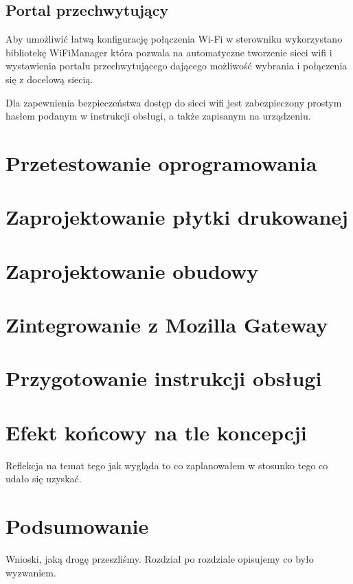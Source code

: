 \documentclass[12pt]{report}
\begin{document}
 
 \section{Portal przechwytujący}
 Aby umożliwić łatwą konfigurację połączenia Wi-Fi w sterowniku wykorzystano bibliotekę WiFiManager która pozwala na automatyczne tworzenie sieci wifi i wystawienia portalu przechwytującego dającego możliwość wybrania i połączenia się z docelową siecią. 
 
 Dla zapewnienia bezpieczeństwa dostęp do sieci wifi jest zabezpieczony prostym hasłem podanym w instrukcji obsługi, a także zapisanym na urządzeniu.
 
 
 
 
 
 \chapter{Przetestowanie oprogramowania}
 
 \chapter{Zaprojektowanie płytki drukowanej}
 
 \chapter{Zaprojektowanie obudowy}
 
 \chapter{Zintegrowanie z Mozilla Gateway}
 
 \chapter{Przygotowanie instrukcji obsługi}
 
 \chapter{Efekt końcowy na tle koncepcji}
 Reflekcja na temat tego jak wygląda to co zaplanowałem w stosunko tego co udało się uzyskać.
 
 \chapter*{Podsumowanie}
 Wnioski, jaką drogę przeszliśmy. Rozdział po rozdziale opisujemy co było wyzwaniem.
 
\end{document}
